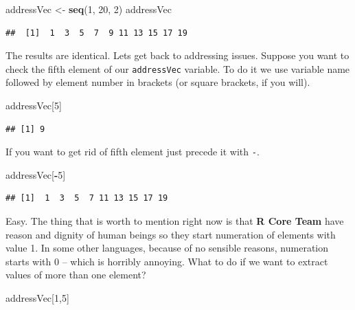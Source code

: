 \documentclass[]{book}
\newenvironment{Shaded}{\begin{snugshade}}{\end{snugshade}}
\newcommand{\KeywordTok}[1]{\textcolor[rgb]{0.13,0.29,0.53}{\textbf{#1}}}
\newcommand{\DecValTok}[1]{\textcolor[rgb]{0.00,0.00,0.81}{#1}}
\newcommand{\StringTok}[1]{\textcolor[rgb]{0.31,0.60,0.02}{#1}}
\newcommand{\OperatorTok}[1]{\textcolor[rgb]{0.81,0.36,0.00}{\textbf{#1}}}
\newcommand{\NormalTok}[1]{#1}
\theoremstyle{definition}
\theoremstyle{definition}
\theoremstyle{definition}
\theoremstyle{remark}
\begin{document}
\begin{Shaded}
\begin{Highlighting}[]
\NormalTok{addressVec <-}\StringTok{ }\KeywordTok{seq}\NormalTok{(}\DecValTok{1}\NormalTok{, }\DecValTok{20}\NormalTok{, }\DecValTok{2}\NormalTok{)}
\NormalTok{addressVec}
\end{Highlighting}
\end{Shaded}

\begin{verbatim}
##  [1]  1  3  5  7  9 11 13 15 17 19
\end{verbatim}

The results are identical. Lets get back to addressing issues. Suppose
you want to check the fifth element of our \texttt{addressVec} variable.
To do it we use variable name followed by element number in brackets (or
square brackets, if you will).

\begin{Shaded}
\begin{Highlighting}[]
\NormalTok{addressVec[}\DecValTok{5}\NormalTok{]}
\end{Highlighting}
\end{Shaded}

\begin{verbatim}
## [1] 9
\end{verbatim}

If you want to get rid of fifth element just precede it with \texttt{-}.

\begin{Shaded}
\begin{Highlighting}[]
\NormalTok{addressVec[}\OperatorTok{-}\DecValTok{5}\NormalTok{]}
\end{Highlighting}
\end{Shaded}

\begin{verbatim}
## [1]  1  3  5  7 11 13 15 17 19
\end{verbatim}

Easy. The thing that is worth to mention right now is that \textbf{R
Core Team} have reason and dignity of human beings so they start
numeration of elements with value 1. In some other languages, because of
no sensible reasons, numeration starts with 0 -- which is horribly
annoying. What to do if we want to extract values of more than one
element?

\begin{Shaded}
\begin{Highlighting}[]
\NormalTok{addressVec[}\DecValTok{1}\NormalTok{,}\DecValTok{5}\NormalTok{]}
\end{Highlighting}
\end{Shaded}
\end{document}
